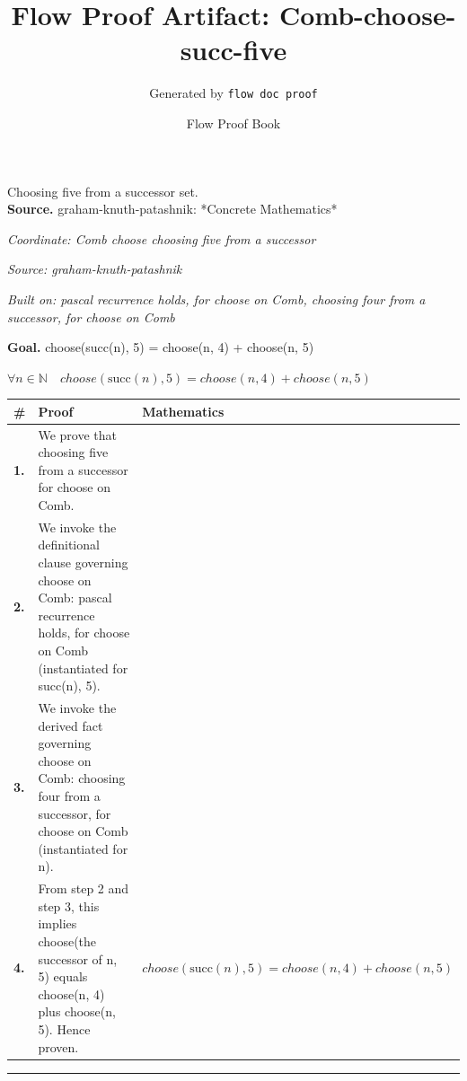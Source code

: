 \documentclass[11pt]{article}
\title{Flow Proof Artifact: Comb-choose-succ-five}
\author{Generated by \texttt{flow doc proof}}
\date{Flow Proof Book}
\theoremstyle{definition}
\begin{document}
\maketitle
Choosing five from a successor set.\\[0.5em]
\textbf{Source.} graham-knuth-patashnik: *Concrete Mathematics*\\[0.5em]
\bigskip
{}\par
\smallskip\noindent\textit{Coordinate: Comb \cdot choose \cdot choosing five from a successor}\par
\smallskip\noindent\textit{Source: graham-knuth-patashnik}\par
\smallskip\noindent\textit{Built on: pascal recurrence holds, for choose on Comb, choosing four from a successor, for choose on Comb}\par
\medskip
\noindent\textbf{Goal.} choose(succ(n), 5) = choose(n, 4) + choose(n, 5)\par
\noindent$\displaystyle \forall n \in \mathbb{N}\quad choose(\mathrm{succ}(n), 5) = choose(n, 4) + choose(n, 5)$\par
\medskip
\noindent
\begin{tabular}{@{} >{\raggedright\arraybackslash}p{} >{\raggedright\arraybackslash}p{} >{\raggedleft\arraybackslash}p{} @{}}
\textbf{\#} & \textbf{Proof} & \textbf{Mathematics} \\
\midrule
\textbf{1.} & We prove that choosing five from a successor for choose on Comb. & \\[0.45em]
\textbf{2.} & We invoke the definitional clause governing choose on Comb: pascal recurrence holds, for choose on Comb (instantiated for succ(n), 5). & \\[0.45em]
\textbf{3.} & We invoke the derived fact governing choose on Comb: choosing four from a successor, for choose on Comb (instantiated for n). & \\[0.45em]
\textbf{4.} & From step 2 and step 3, this implies choose(the successor of n, 5) equals choose(n, 4) plus choose(n, 5). Hence proven. & $\displaystyle choose(\mathrm{succ}(n), 5) = choose(n, 4) + choose(n, 5)$ \\[0.45em]
\bottomrule
\end{tabular}
\label{thm:Comb-choose-choosing_five_from_a_successor}
\par\medskip\hrule
\end{document}
